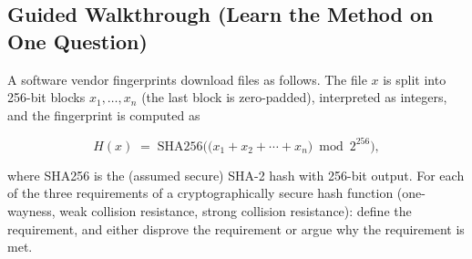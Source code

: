 \documentclass[12pt, a4paper]{article}
\begin{document}
\subsection*{Guided Walkthrough (Learn the Method on One Question)}

\begin{problembox}
A software vendor fingerprints download files as follows. The file $x$ is split into 256-bit blocks $x_1, \dots, x_n$ (the last block is zero-padded), interpreted as integers, and the fingerprint is computed as

\[
H(x) \;=\; \mathrm{SHA256}\Big( \big(x_1 + x_2 + \cdots + x_n\big) \bmod 2^{256} \Big),
\]

where SHA256 is the (assumed secure) SHA-2 hash with 256-bit output. For each of the three requirements of a cryptographically secure hash function (one-wayness, weak collision resistance, strong collision resistance): define the requirement, and either disprove the requirement or argue why the requirement is met.
\end{problembox}
\end{document}
